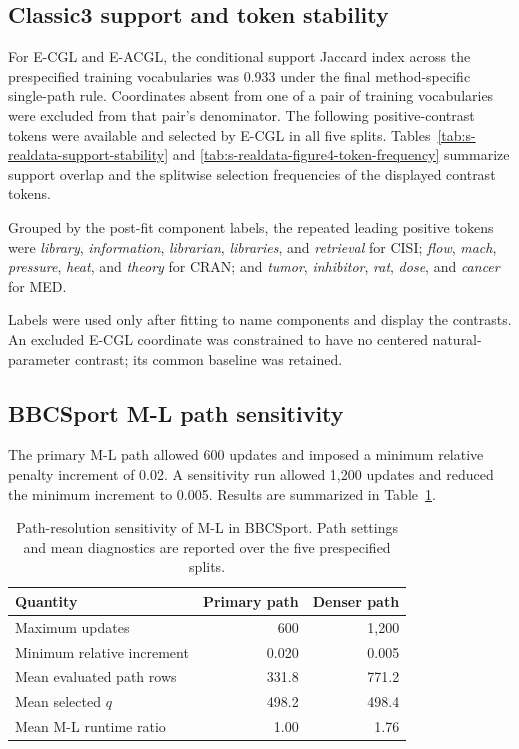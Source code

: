 \documentclass[preprint,12pt,authoryear]{elsarticle}
\begin{document}
\subsection{Classic3 support and token stability}

For E-CGL and E-ACGL, the conditional support Jaccard index across the prespecified
training vocabularies was 0.933 under the final method-specific single-path
rule. Coordinates absent
from one of a pair of training vocabularies were excluded from that pair's
denominator. The following positive-contrast tokens were available and
selected by E-CGL in all five splits. Tables~\ref{tab:s-realdata-support-stability}
and \ref{tab:s-realdata-figure4-token-frequency} summarize support overlap and
the splitwise selection frequencies of the displayed contrast tokens.

Grouped by the post-fit component labels, the repeated leading positive tokens
were \emph{library}, \emph{information}, \emph{librarian}, \emph{libraries},
and \emph{retrieval} for CISI; \emph{flow}, \emph{mach}, \emph{pressure},
\emph{heat}, and \emph{theory} for CRAN; and \emph{tumor}, \emph{inhibitor},
\emph{rat}, \emph{dose}, and \emph{cancer} for MED.

Labels were used only after fitting to name components and display the
contrasts. An excluded E-CGL coordinate was constrained to have no centered
natural-parameter contrast; its common baseline was retained.

\FloatBarrier





\FloatBarrier

\clearpage
\subsection{BBCSport M-L path sensitivity}

The primary M-L path allowed 600 updates and imposed a minimum relative
penalty increment of 0.02. A sensitivity run allowed 1,200 updates and reduced
the minimum increment to 0.005. Results are summarized in
Table~\ref{tab:s-bbcsport-ml-path}.

\begin{table}[H]
\centering
\small
\caption{Path-resolution sensitivity of M-L in BBCSport. Path settings and
mean diagnostics are reported over the five prespecified splits.}
\label{tab:s-bbcsport-ml-path}
\begin{tabular}{lrr}
\toprule
Quantity & Primary path & Denser path \\
\midrule
Maximum updates & 600 & 1,200 \\
Minimum relative increment & 0.020 & 0.005 \\
Mean evaluated path rows & 331.8 & 771.2 \\
Mean selected $q$ & 498.2 & 498.4 \\
Mean M-L runtime ratio & 1.00 & 1.76 \\
\bottomrule
\end{tabular}
\end{table}
\end{document}
